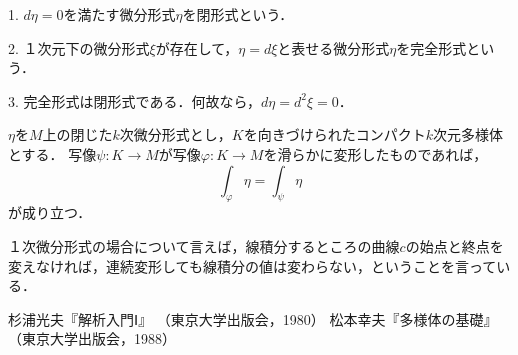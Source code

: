 \documentclass[uplatex, dvipdfmx]{jsreport}
\begin{document}
\begin{definition}
    
    1. $d\eta =0$を満たす微分形式$\eta$を閉形式という．

    2. １次元下の微分形式$\xi$が存在して，$\eta =d\xi$と表せる微分形式$\eta$を完全形式という．

    3. 完全形式は閉形式である．何故なら，$d\eta =d^2\xi = 0$．
\end{definition}

\begin{proposition}
    $\eta$を$M$上の閉じた$k$次微分形式とし，$K$を向きづけられたコンパクト$k$次元多様体とする．
    写像$\psi:K\to M$が写像$\varphi:K\to M$を滑らかに変形したものであれば，
    \[\int_\varphi\eta=\int_\psi\eta \]
    が成り立つ．
\end{proposition}
\begin{example}
    １次微分形式の場合について言えば，線積分するところの曲線$c$の始点と終点を変えなければ，連続変形しても線積分の値は変わらない，ということを言っている．
\end{example}

\begin{thebibliography}{99}
        杉浦光夫『解析入門Ⅰ』
        （東京大学出版会，1980）
        松本幸夫『多様体の基礎』
        （東京大学出版会，1988）
\end{thebibliography}
\end{document}
